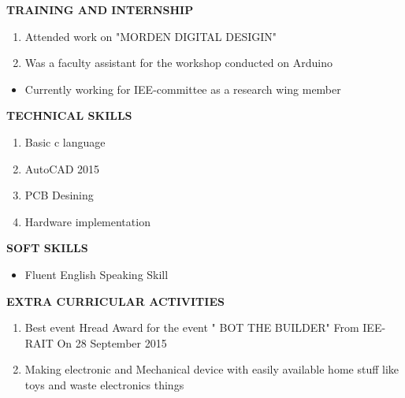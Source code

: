 \documentclass[a4paper]{article}
\begin{document}
\begin{flushleft}
\textbf {TRAINING AND INTERNSHIP}\\
\begin{enumerate}
\item Attended work on "MORDEN DIGITAL DESIGIN" 
\item Was a faculty assistant for the workshop conducted on Arduino
\end{enumerate}
\end{flushleft}


\begin{flushleft}
\textbf {}
\begin{itemize}
\item Currently working for IEE-committee as a research wing member
\end{itemize}
\end{flushleft}

\begin{flushleft}
\textbf {TECHNICAL SKILLS}\\
\begin{enumerate}
\item Basic c language
\item AutoCAD 2015
\item PCB Desining
\item Hardware implementation
\end{enumerate}
\end{flushleft}

\begin{flushleft}
\textbf {SOFT SKILLS}\\
\begin{itemize}
\item  Fluent English Speaking Skill

\end{itemize}
\end{flushleft}

\begin{flushleft}
\textbf {EXTRA CURRICULAR ACTIVITIES}\\
\begin{enumerate}
\item Best event Hread Award for the event " BOT THE BUILDER"  From IEE-RAIT On 28 September 2015
\item Making electronic and Mechanical device with easily available home stuff like toys and waste electronics things
\end{enumerate}
\end{flushleft}
\end{document}
